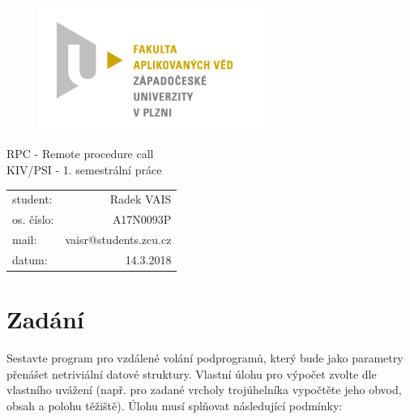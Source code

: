 \documentclass[12pt, a4paper]{article}
\begin{document}
\begin{figure}[h!]
\centering
\includegraphics[bb= 0 0 820 445 , width=75mm]{favlogo.jpg}
\end{figure}

{\centering
{\huge RPC - Remote procedure call}\\[1em]
{\large KIV/PSI - 1. semestrální práce}\\[11,5cm]
}

\begin{tabular}{l r}
student: & Radek VAIS\\
os. číslo: & A17N0093P\\
mail: & vaisr@students.zcu.cz\\
datum: & 14.3.2018\\
\end{tabular}

\thispagestyle{empty}
\newpage

\section{Zadání} %

Sestavte program pro vzdálené volání podprogramů, který bude jako parametry přenášet netriviální datové struktury. Vlastní úlohu pro výpočet zvolte dle vlastního uvážení (např. pro zadané vrcholy trojúhelníka vypočtěte jeho obvod, obsah a polohu těžiště). Úlohu musí splňovat následující podmínky:
\end{document}
